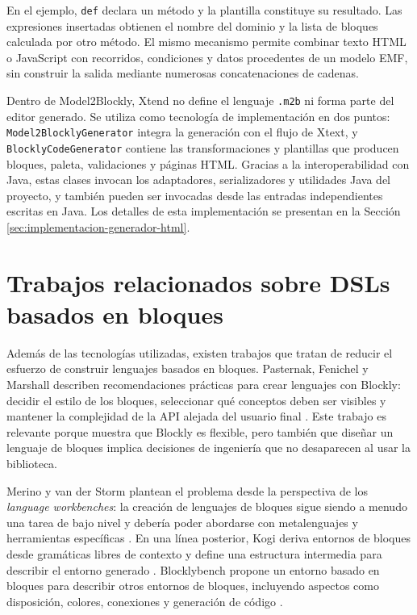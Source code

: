 En el ejemplo, \texttt{def} declara un método y la plantilla constituye su
resultado. Las expresiones insertadas obtienen el nombre del dominio y la lista
de bloques calculada por otro método. El mismo mecanismo permite combinar texto
HTML o JavaScript con recorridos, condiciones y datos procedentes de un modelo
EMF, sin construir la salida mediante numerosas concatenaciones de cadenas.

Dentro de Model2Blockly, Xtend no define el lenguaje \texttt{.m2b} ni forma
parte del editor generado. Se utiliza como tecnología de implementación en dos
puntos: \texttt{Model2Blockly}\allowbreak\texttt{Generator} integra la
generación con el flujo de Xtext, y
\texttt{BlocklyCode}\allowbreak\texttt{Generator} contiene las transformaciones y
plantillas que producen bloques, paleta, validaciones y páginas HTML. Gracias
a la interoperabilidad con Java, estas clases invocan los adaptadores,
serializadores y utilidades Java del proyecto, y también pueden ser invocadas
desde las entradas independientes escritas en Java. Los detalles de esta
implementación se presentan en la Sección
\ref{sec:implementacion-generador-html}.

\section{Trabajos relacionados sobre DSLs basados en bloques}
\label{sec:trabajos-relacionados-block-dsl}

Además de las tecnologías utilizadas, existen trabajos que tratan de reducir el
esfuerzo de construir lenguajes basados en bloques. Pasternak, Fenichel y
Marshall describen recomendaciones prácticas para crear lenguajes con Blockly:
decidir el estilo de los bloques, seleccionar qué conceptos deben ser visibles y
mantener la complejidad de la API alejada del usuario final
\cite{pasternak2017tips}. Este trabajo es relevante porque muestra que Blockly
es flexible, pero también que diseñar un lenguaje de bloques implica decisiones
de ingeniería que no desaparecen al usar la biblioteca.

Merino y van der Storm plantean el problema desde la perspectiva de los
\emph{language workbenches}: la creación de lenguajes de bloques sigue siendo a
menudo una tarea de bajo nivel y debería poder abordarse con metalenguajes y
herramientas específicas \cite{verano2018workbenchBlocks}. En una línea
posterior, Kogi deriva entornos de bloques desde gramáticas libres de contexto y
define una estructura intermedia para describir el entorno generado
\cite{verano2020kogi}. Blocklybench propone un entorno basado en bloques para
describir otros entornos de bloques, incluyendo aspectos como disposición,
colores, conexiones y generación de código \cite{verano2022blocklybench}.


